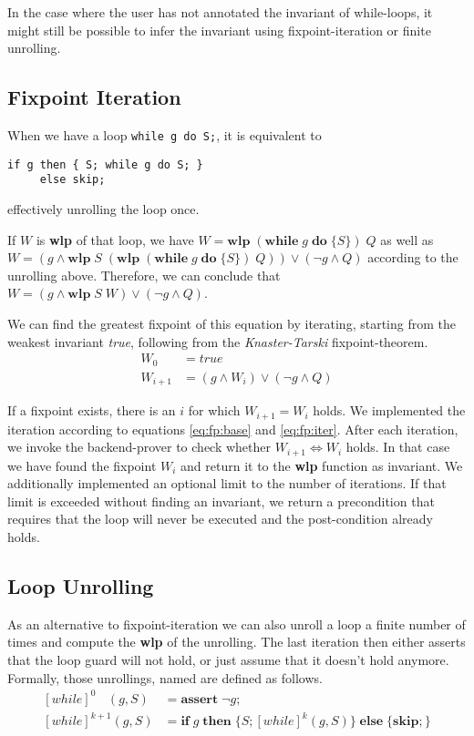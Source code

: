 \documentclass[]{scrartcl}
\newcommand{\WHILE}[2]{\ensuremath{\mathbf{while}\;#1\;\mathbf{do}\;\{#2\}}}
\newcommand{\IF}[3]{\ensuremath{\mathbf{if}\;#1\;\mathbf{then}\;\{#2\}\;\mathbf{else}\;\{#3\}}}
\newcommand{\SKIP}{\ensuremath{\mathbf{skip};}}
\newcommand{\ASSERT}[1]{\ensuremath{\mathbf{assert}\;#1;}}
\newcommand{\WLP}[2]{\ensuremath{\mathbf{wlp}\;#1\;#2}}
\newcommand{\UNROLLSQ}[3]{\ensuremath{[\mathit{while}]^{#1}(#2, #3)}}
\begin{document}
In the case where the user has not annotated the invariant of while-loops,
it might still be possible to infer the invariant using fixpoint-iteration
or finite unrolling.

\subsection{Fixpoint Iteration}

When we have a loop \lstinline|while g do S;|, it is equivalent to
\begin{lstlisting}
if g then { S; while g do S; }
     else skip;
\end{lstlisting}
effectively unrolling the loop once.

If $W$ is \textbf{wlp} of that loop, we have $W = \WLP{(\WHILE{g}{S})}{Q}$ as well as
$W = (g \land \WLP{S}{(\WLP{(\WHILE{g}{S})}{Q})}) \lor (\neg g \land Q)$ according to the unrolling above.
Therefore, we can conclude that $W = (g \land \WLP{S}{W}) \lor (\neg g \land Q)$.

We can find the greatest fixpoint of this equation by iterating, starting from the weakest invariant \emph{true},
following from the \emph{Knaster-Tarski} fixpoint-theorem.
\begin{align}
  \label{eq:fp:base} W_0 &= \mathit{true} \\
  \label{eq:fp:iter} W_{i+1} &= (g \land W_i) \lor (\neg g \land Q)
\end{align}

If a fixpoint exists, there is an $i$ for which $W_{i+1} = W_i$ holds.
We implemented the iteration according to equations \ref{eq:fp:base} and \ref{eq:fp:iter}.
After each iteration, we invoke the backend-prover to check whether $W_{i+1} \iff W_i$ holds.
In that case we have found the fixpoint $W_i$ and return it to the \textbf{wlp} function as
invariant.
We additionally implemented an optional limit to the number of iterations.
If that limit is exceeded without finding an invariant, we return a precondition that requires
that the loop will never be executed and the post-condition already holds.

\subsection{Loop Unrolling}

As an alternative to fixpoint-iteration we can also unroll a loop a finite number of times and
compute the \textbf{wlp} of the unrolling. The last iteration then either asserts that the
loop guard will not hold, or just assume that it doesn't hold anymore.
Formally, those unrollings, named  are defined as follows.
\begin{align}
\UNROLLSQ{0\phantom{+1}}{g}{S} &= \ASSERT{\neg g} \\
\UNROLLSQ{k+1}{g}{S} &= \IF{g}{S; \UNROLLSQ{k}{g}{S}}{\SKIP}
\end{align}
\end{document}
